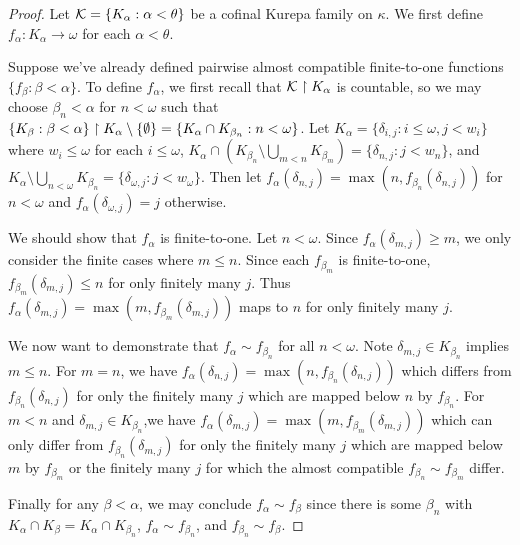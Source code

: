 \documentclass{amsart}
\theoremstyle{plain}
\theoremstyle{definition}
\theoremstyle{remark}
\theoremstyle{plain}
\theoremstyle{definition}
\theoremstyle{remark}
\begin{document}
  \begin{proof}
    Let \(\mathcal{K}=\{K_\alpha:\alpha<\theta\}\)
    be a cofinal Kurepa family on \(\kappa\).
    We first define \(f_\alpha:K_\alpha\to\omega\) for each \(\alpha<\theta\).

    Suppose we've already defined pairwise almost compatible finite-to-one functions
    \(\{f_\beta:\beta<\alpha\}\). To define
    \(f_\alpha\), we first recall that \(\mathcal{K}\restriction K_\alpha\) is countable,
    so we may choose \(\beta_n<\alpha\) for \(n<\omega\) such that
    \(
      \{K_\beta:\beta<\alpha\}\restriction K_\alpha \setminus \{\emptyset\}
        =
      \{K_\alpha\cap K_{\beta_n}:n<\omega\}
    \).
    Let \(K_\alpha=\{\delta_{i,j}:i\leq\omega,j<w_i\}\) where
    \(w_i\leq\omega\) for each \(i\leq\omega\),
    \(
      K_\alpha\cap \left(K_{\beta_n}\setminus\bigcup_{m<n}K_{\beta_m}\right)
        =
      \{\delta_{n,j}:j<w_n\}
    \),
    and
    \(
      K_\alpha\setminus\bigcup_{n<\omega}K_{\beta_n}
        =
      \{
        \delta_{\omega,j}:j<w_\omega
      \}
    \).
    Then let \(f_\alpha(\delta_{n,j})=\max(n,f_{\beta_n}(\delta_{n,j}))\) for
    \(n<\omega\) and \(f_\alpha(\delta_{\omega,j})=j\) otherwise.

    We should show that \(f_\alpha\) is finite-to-one. Let \(n<\omega\).
    Since \(f_\alpha(\delta_{m,j})\geq m\), we only consider the finite cases
    where \(m\leq n\). Since each
    \(f_{\beta_m}\) is finite-to-one, \(f_{\beta_m}(\delta_{m,j})\leq n\)
    for only finitely many \(j\). Thus
    \(f_\alpha(\delta_{m,j})=\max(m,f_{\beta_m}(\delta_{m,j}))\) maps to
    \(n\) for only finitely many \(j\).

    We now want to demonstrate that \(f_\alpha\sim f_{\beta_n}\) for all
    \(n<\omega\). Note \(\delta_{m,j}\in K_{\beta_n}\) implies
    \(m\leq n\).
    For \(m=n\), we have
    \(f_\alpha(\delta_{n,j})=\max(n,f_{\beta_n}(\delta_{n,j}))\) which differs
    from \(f_{\beta_n}(\delta_{n,j})\) for only the finitely many \(j\) which
    are mapped below \(n\) by \(f_{\beta_n}\).
    For \(m<n\) and \(\delta_{m,j}\in K_{\beta_n}\),we have
    \(f_\alpha(\delta_{m,j})=\max(m,f_{\beta_m}(\delta_{m,j}))\) which can
    only differ
    from \(f_{\beta_n}(\delta_{m,j})\) for only the finitely many \(j\) which
    are mapped below \(m\) by \(f_{\beta_m}\) or the finitely many \(j\)
    for which the
    almost compatible \(f_{\beta_n}\sim f_{\beta_m}\) differ.

    Finally for any \(\beta<\alpha\), we may conclude \(f_\alpha\sim f_\beta\)
    since there is some \(\beta_n\) with
    \(K_\alpha\cap K_\beta=K_\alpha\cap K_{\beta_n}\),
    \(f_\alpha\sim f_{\beta_n}\), and \(f_{\beta_n}\sim f_\beta\).
  \end{proof}
\end{document}
